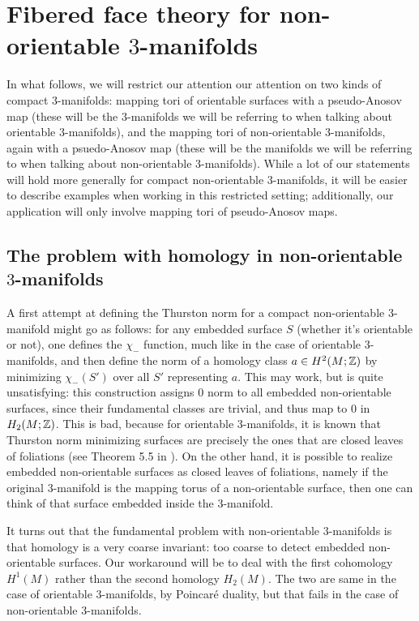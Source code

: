 \section{Fibered face theory for non-orientable $3$-manifolds}
\label{sec:fibered-face-theory}

In what follows, we will restrict our attention our attention on two kinds of compact $3$-manifolds:
mapping tori of orientable surfaces with a pseudo-Anosov map (these will be the $3$-manifolds we
will be referring to when talking about orientable $3$-manifolds), and the mapping tori of
non-orientable $3$-manifolds, again with a psuedo-Anosov map (these will be the manifolds we will be
referring to when talking about non-orientable $3$-manifolds). While a lot of our statements will
hold more generally for compact non-orientable $3$-manifolds, it will be easier to describe examples
when working in this restricted setting; additionally, our application will only involve mapping
tori of pseudo-Anosov maps.

\subsection{The problem with homology in non-orientable $3$-manifolds}
\label{sec:probl-with-homol}

A first attempt at defining the Thurston norm for a compact non-orientable $3$-manifold might go as
follows: for any embedded surface $S$ (whether it's orientable or not), one defines the $\chi_-$
function, much like in the case of orientable $3$-manifolds, and then define the norm of a homology
class $a \in H^2(M; \mathbb{Z})$ by minimizing $\chi_-(S')$ over all $S'$ representing $a$. This may work,
but is quite unsatisfying: this construction assigns $0$ norm to all embedded non-orientable
surfaces, since their fundamental classes are trivial, and thus map to $0$ in $H_2(M; \mathbb{Z})$. This is bad,
because for orientable $3$-manifolds, it is known that Thurston norm minimizing surfaces are
precisely the ones that are closed leaves of foliations (see Theorem 5.5 in \cite{gabai1983}). On
the other hand, it is possible to realize embedded non-orientable surfaces as closed leaves of
foliations, namely if the original $3$-manifold is the mapping torus of a non-orientable surface,
then one can think of that surface embedded inside the $3$-manifold.

It turns out that the fundamental problem with non-orientable $3$-manifolds is that homology is a
very coarse invariant: too coarse to detect embedded non-orientable surfaces. Our workaround will
be to deal with the first cohomology $H^1(M)$ rather than the second homology $H_2(M)$. The two are
same in the case of orientable $3$-manifolds, by Poincar\'e duality, but that fails in the case
of non-orientable $3$-manifolds.

